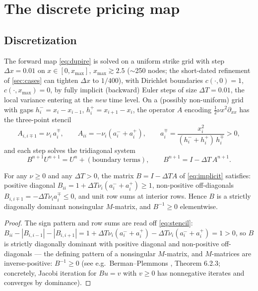 \documentclass[11pt]{article}
\begin{document}
\section{The discrete pricing map}
\label{sec:pricing}

\subsection{Discretization}

The forward map \eqref{eq:dupire} is solved on a uniform strike grid with step
$\Delta x=0.01$ on $x\in[0,x_{\max}]$, $x_{\max}\gtrsim2.5$ ($\sim$250 nodes;
the short-dated refinement of \cref{sec:cases} can tighten $\Delta x$ to
$1/400$), with Dirichlet boundaries $c(\cdot,0)=1$, $c(\cdot,x_{\max})=0$, by
fully implicit (backward) Euler steps of size $\Delta T=0.01$, the local
variance entering at the \emph{new} time level. On a (possibly non-uniform)
grid with gaps $h^-_i=x_i-x_{i-1}$, $h^+_i=x_{i+1}-x_i$, the operator
$A$ encoding $\tfrac12\nu x^2\partial_{xx}$ has the three-point stencil
\begin{equation}
A_{i,i\mp1}=\nu_i\,a^\mp_i,\qquad
A_{ii}=-\nu_i(a^-_i+a^+_i),\qquad
a^\mp_i=\frac{x_i^2}{(h^-_i+h^+_i)\,h^\mp_i}>0,
\label{eq:stencil}
\end{equation}
and each step solves the tridiagonal system
\begin{equation}
B^{n+1}U^{n+1}=U^{n}+(\text{boundary terms}),\qquad
B^{n+1}=I-\Delta T\,A^{n+1}.
\label{eq:implicit}
\end{equation}

\begin{proposition}
\label{prop:mmatrix}
For any $\nu\ge0$ and any $\Delta T>0$, the matrix $B=I-\Delta T A$ of
\eqref{eq:implicit} satisfies: positive diagonal
$B_{ii}=1+\Delta T\nu_i(a^-_i+a^+_i)\ge1$, non-positive off-diagonals
$B_{i,i\mp1}=-\Delta T\nu_i a^\mp_i\le0$, and unit row sums at interior rows.
Hence $B$ is a strictly diagonally dominant nonsingular $M$-matrix, and
$B^{-1}\ge0$ elementwise.
\end{proposition}

\begin{proof}
The sign pattern and row sums are read off \eqref{eq:stencil}:
$B_{ii}-|B_{i,i-1}|-|B_{i,i+1}|
=1+\Delta T\nu_i(a^-_i+a^+_i)-\Delta T\nu_i(a^-_i+a^+_i)=1>0$, so $B$ is
strictly diagonally dominant with positive diagonal and non-positive
off-diagonals --- the defining pattern of a nonsingular $M$-matrix, and
$M$-matrices are inverse-positive: $B^{-1}\ge0$ (see e.g.\ Berman--Plemmons
\cite{BermanPlemmons1994}, Theorem 6.2.3; concretely, Jacobi iteration for
$Bu=v$ with $v\ge0$ has nonnegative iterates and converges by dominance).
\end{proof}
\end{document}

